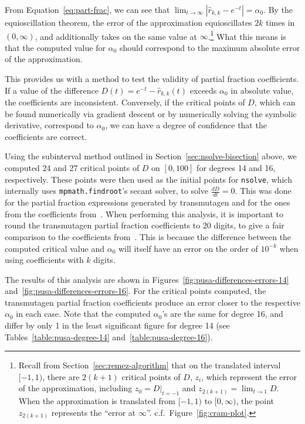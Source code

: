 From Equation~\ref{eq:part-frac}, we can see that
$\lim_{t\to\infty}{\left|\hat{r}_{k,k} - e^{-t}\right|} = \alpha_0$. By the
equioscillation theorem, the error of the approximation equioscillates $2k$
times in $(0, \infty)$, and additionally takes on the same value at
$\infty$.\footnote{Recall from Section~\ref{sec:remez-algorithm} that on the
  translated interval $[-1, 1)$, there are $2(k+1)$ critical points of $D$,
  $z_i$, which represent the error of the approximation, including
  $z_0 = D|_{t=-1}$ and $z_{2(k+1)}=\lim_{t\to 1}{D}$. When the approximation
  is translated from $[-1, 1)$ to $[0, \infty)$, the point $z_{2(k + 1)}$
  represents the ``error at $\infty$''. c.f.\ Figure~\ref{fig:cram-plot}.}
What this means is that the computed value for $\alpha_0$ should correspond to
the maximum absolute error of the approximation.

This provides us with a method to test the validity of partial fraction
coefficients. If a value of the difference $D(t) = e^{-t} - \hat{r}_{k,k}(t)$
exceeds $\alpha_0$ in absolute value, the coefficients are inconsistent.
Conversely, if the critical points of $D$, which can be found numerically via
gradient descent or by numerically solving the symbolic derivative, correspond
to $\alpha_0$, we can have a degree of confidence that the coefficients are
correct.

Using the subinterval method outlined in Section~\ref{sec:nsolve-bisection}
above, we computed 24 and 27 critical points of $D$ on $[0, 100]$ for degrees
14 and 16, respectively. These points were then used as the initial points for
\texttt{nsolve}, which internally uses \texttt{mpmath.findroot}'s secant
solver, to solve $\frac{dD}{dt}=0$. This was done for the partial fraction
expressions generated by transmutagen and for the ones from the coefficients
from~\cite{pusa2012correction}.  When performing this analysis, it is
important to round the transmutagen partial fraction coefficients to 20
digits, to give a fair comparison to the coefficients
from~\cite{pusa2012correction}. This is because the difference between the
computed critical value and $\alpha_0$ will itself have an error on the order
of $10^{-k}$ when using coefficients with $k$ digits.

The results of this analysis are shown in
Figures~\ref{fig:pusa-differences-errors-14}
and~\ref{fig:pusa-differences-errors-16}. For the critical points computed,
the transmutagen partial fraction coefficients produce an error closer to the
respective $\alpha_0$ in each case. Note that the computed $\alpha_0$'s are the
same for degree 16, and differ by only 1 in the least significant figure for
degree 14 (see Tables~\ref{table:pusa-degree-14} and~\ref{table:pusa-degree-16}).

